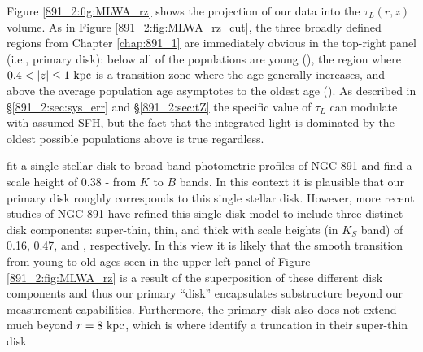 Figure \ref{891_2:fig:MLWA_rz} shows the projection of our data into
the $\tau_L(r,z)$ volume. As in Figure \ref{891_2:fig:MLWA_rz_cut},
the three broadly defined regions from Chapter \ref{chap:891_1} are
immediately obvious in the top-right panel (i.e., primary disk): below
 all of the populations are young (), the
region where $0.4 < |z| \leq 1~\mathrm{kpc} $ is a transition zone where
the age generally increases, and above  the average
population age asymptotes to the oldest age (). As
described in \S\ref{891_2:sec:sys_err} and \S\ref{891_2:sec:tZ} the
specific value of $\tau_L$ can modulate with assumed SFH, but the fact
that the integrated light is dominated by the oldest possible
populations above  is true regardless.

\citet{Xilouris99} fit a single stellar disk to broad band photometric
profiles of NGC 891 and find a scale height of 0.38 - 
from $K$ to $B$ bands. In this context it is plausible that our
primary disk roughly corresponds to this single stellar disk. However,
more recent studies of NGC 891 \citep{Schechtman-Rook12,
  Schechtman-Rook13, Schechtman-Rook14} have refined this single-disk
model to include three distinct disk components: super-thin, thin, and
thick with scale heights (in $K_S$ band) of 0.16, 0.47, and
, respectively. In this view it is likely that the
smooth transition from young to old ages seen in the upper-left panel
of Figure \ref{891_2:fig:MLWA_rz} is a result of the superposition of
these different disk components and thus our primary ``disk''
encapsulates substructure beyond our measurement
capabilities. Furthermore, the primary disk also does not extend much
beyond $r=8~\mathrm{kpc} $, which is where \citet{Schechtman-Rook13}
identify a truncation in their super-thin disk




